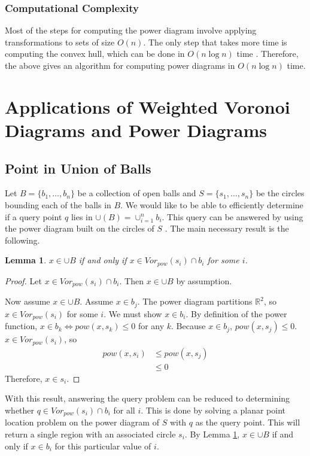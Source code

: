 \documentclass[a4paper, 11pt]{article}
\newtheorem{lemma}{Lemma}[section]
\newcommand{\R}{\mathbb{R}}
\begin{document}
\subsubsection{Computational Complexity}

Most of the steps for computing the power diagram involve applying transformations to sets of size $O(n)$. The only step that takes more time is
computing the convex hull, which can be done in $O(n \log n)$ time \cite{comp_geom}. Therefore, the above gives an algorithm for computing power
diagrams in $O(n \log n)$ time.

\section{Applications of Weighted Voronoi Diagrams and Power Diagrams}

\subsection{Point in Union of Balls}

Let $B = \{b_1,\dots, b_n\}$ be a collection of open balls and $S = \{s_1, \dots, s_n\}$ be the circles bounding each of the balls in $B$. We would
like to be able to efficiently determine if a query point $q$ lies in $\cup(B) = \cup_{i=1}^n b_i$. This query can be answered by using the power diagram
built on the circles of $S$ \cite{aurenhammer_discs}. The main necessary result is the following.

\begin{lemma}
  \label{lem:pow_query}
  $x \in \cup B$ if and only if $x \in Vor_{pow}(s_i) \cap b_i$ for some $i$.
\end{lemma}
\begin{proof}
  Let $x \in Vor_{pow}(s_i) \cap b_i$. Then $x \in \cup B$ by assumption.

  Now assume $x \in \cup B$. Assume $x \in b_j$. The power diagram partitions $\R^2$, so $x \in Vor_{pow}(s_i)$ for some $i$. We must show $x \in
  b_i$. By definition of the power function, $x \in b_k \Leftrightarrow pow(x,s_k) \leq 0$ for any $k$. Because $x \in b_j$, $pow(x,s_j) \leq 0$. $x
  \in Vor_{pow}(s_i)$, so
  \begin{align*}
    pow(x,s_i) &\leq pow(x, s_j) \\
    &\leq 0
  \end{align*}
  Therefore, $x \in s_i$.
\end{proof}

With this result, answering the query problem can be reduced to determining whether $q \in Vor_{pow}(s_i) \cap b_i$ for all $i$. This is done by
solving a planar point location problem on the power diagram of $S$ with $q$ as the query point. This will return a single region with an associated
circle $s_i$. By Lemma \ref{lem:pow_query}, $x \in \cup B$ if and only if $x \in b_i$ for this particular value of $i$.
\end{document}
